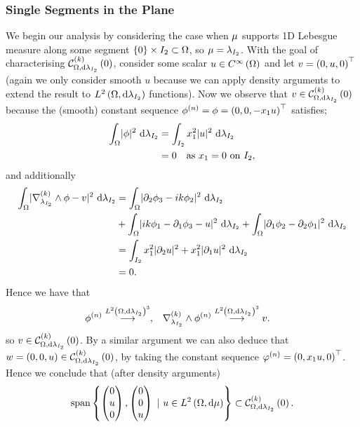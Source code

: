 \subsubsection{Single Segments in the Plane}
We begin our analysis by considering the case when $\mu$ supports 1D Lebesgue measure along some segment $\left\{ 0 \right\}\times I_2\subset\Omega$, so $\mu=\lambda_{I_2}$.
With the goal of characterising $\mathcal{C}_{ \Omega, \mathrm{d}\lambda_{I_2}}^{(k)}\left( 0 \right)$, consider some scalar $u\in C^{\infty}\left( \Omega \right)$ and let $v = \left( 0,u,0 \right)^{\top}$ (again we only consider smooth $u$ because we can apply density arguments to extend the result to $L^{2}\left( \Omega,\mathrm{d}\lambda_{I_2} \right)$ functions).
Now we observe that $v\in\mathcal{C}_{ \Omega, \mathrm{d}\lambda_{I_2}}^{(k)}\left( 0 \right)$ because the (smooth) constant sequence $\phi^{(n)} = \phi = \left( 0,0,-x_1 u \right)^{\top}$ satisfies;
\begin{align*}
	\int_{\Omega}\lvert \phi \rvert^2 \ \mathrm{d}\lambda_{I_2} &= \int_{I_2}x_1^2\lvert u \rvert^2 \ \mathrm{d}\lambda_{I_2} \\
	&= 0 \quad\text{as } x_1 = 0 \text{ on } I_2,
\end{align*}
and additionally
\begin{align*}
	\int_{\Omega}\lvert \nabla_{\lambda_{I_2}}^{(k)}\wedge\phi - v \rvert^2 \ \mathrm{d}\lambda_{I_2} &= \int_{\Omega}\lvert \partial_2\phi_3 - ik\phi_2 \rvert^2 \ \mathrm{d}\lambda_{I_2} \\
	&+ \int_{\Omega}\lvert ik\phi_1 - \partial_1\phi_3 - u \rvert^2 \ \mathrm{d}\lambda_{I_2} + \int_{\Omega}\lvert \partial_1\phi_2 - \partial_2\phi_1 \rvert^2 \ \mathrm{d}\lambda_{I_2} \\
	&= \int_{I_2}x_1^2\lvert \partial_2 u \rvert^2 + x_1^2\lvert \partial_1 u \rvert^2 \ \mathrm{d}\lambda_{I_2} \\
	&= 0.
\end{align*}
Hence we have that
\begin{align} \label{eq:Curl0SeqConv}
	\phi^{(n)} \overset{L^{2}\left( \Omega,\mathrm{d}\lambda_{I_2} \right)^3}{\longrightarrow},
	&\quad \nabla_{\lambda_{I_2}}^{(k)}\wedge\phi^{(n)} \overset{L^{2}\left( \Omega,\mathrm{d}\lambda_{I_2} \right)^3}{\longrightarrow} v.
\end{align}
so $v\in\mathcal{C}_{ \Omega, \mathrm{d}\lambda_{I_2}}^{(k)}\left( 0 \right)$.
By a similar argument we can also deduce that $w=\left( 0,0,u \right)\in\mathcal{C}_{ \Omega, \mathrm{d}\lambda_{I_2}}^{(k)}\left( 0 \right)$, by taking the constant sequence $\varphi^{(n)}=\left( 0,x_1 u,0 \right)^{\top}$.
Hence we conclude that (after density arguments)
\begin{align*}
	\mathrm{span}\clbracs{\begin{pmatrix} 0 \\ u \\ 0 \end{pmatrix}, \begin{pmatrix} 0 \\ 0 \\ u \end{pmatrix} \ \vert \ u\in\ltwo{\ddom}{\ddmes}} \subset \kcurlZero{\ddom}{\lambda_{I_2}}.
\end{align*}
